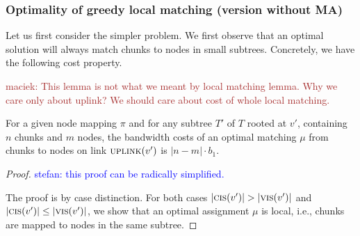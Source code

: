 \documentclass[9pt,twocolumn]{scrartcl}
\newcommand{\maciek}[1]{\textcolor{brown}{maciek: #1}}
\newcommand{\stefan}[1]{\textcolor{blue}{stefan: #1}}
\newcommand{\VmChunkAssignment}{\mu}
\newcommand{\NodeMapping}{\pi}
\newcommand{\ChunkLocation}{\pi}
\newcommand{\SubstrateNodes}{\ensuremath{V_S}}
\newcommand{\SubstrateNode}{\ensuremath{v}}
\newcommand{\Leaf}{\ensuremath{l}}
\newcommand{\Leaves}{\ensuremath{L}}
\newcommand{\Chunks}{\ensuremath{\textsc{chunks}}}
\newcommand{\Children}{\ensuremath{children}}
\newcommand{\Uplink}{\ensuremath{\textsc{uplink}}}
\newcommand{\ChunkCount}{\ensuremath{\textsc{cis}}}
\newcommand{\VmCount}{\ensuremath{\textsc{vis}}}
\newcommand{\achunk}{\ensuremath{c}}
\newcommand{\Tree}{\ensuremath{T}}
\newcommand{\CostTrans}{\ensuremath{b_1}}
\begin{document}
\begin{appendix}

\subsubsection{Optimality of greedy local matching (version without MA)}

Let us first consider the simpler problem.
We first observe that an optimal solution will always
match chunks to nodes in small subtrees. Concretely,
we have the following cost property.

\maciek{This lemma is not what we meant by local matching lemma. Why we care only about uplink? We should care about cost of whole local matching.}

\begin{lemma}
\label{lemma:local_matching}
For a given node mapping $\NodeMapping$ and for any subtree $\Tree'$
of $\Tree$ rooted at $\SubstrateNode'$, containing $n$ chunks and $m$
nodes, the bandwidth costs of an optimal matching $\VmChunkAssignment$
from chunks to nodes on link $\Uplink(\SubstrateNode')$ is $|n
- m| \cdot \CostTrans$.
\end{lemma}
\begin{proof}
\stefan{this proof can be radically simplified.}

The proof is by case distinction. For both cases $|\ChunkCount(\SubstrateNode')| >
|\VmCount(\SubstrateNode')|$ and $|\ChunkCount(\SubstrateNode')| \leq
|\VmCount(\SubstrateNode')|$, we show that an optimal assignment
$\VmChunkAssignment$ is local, i.e., chunks are mapped to nodes in the
same subtree.


\end{proof}
\end{appendix}
\end{document}
